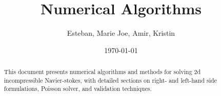 \documentclass[12pt]{article}
\title{\textbf{Numerical Algorithms}}
\author{Esteban, Marie Joe, Amir, Kristin}
\date{\today}
\theoremstyle{plain}
\theoremstyle{definition}
\theoremstyle{remark}
\begin{document}
\maketitle
\begin{abstract}
This document presents numerical algorithms and methods for solving 2d incompressible Navier-stokes, with detailed sections on right- and left-hand side formulations, Poisson solver, and validation techniques.
\end{abstract}









% 
\end{document}
